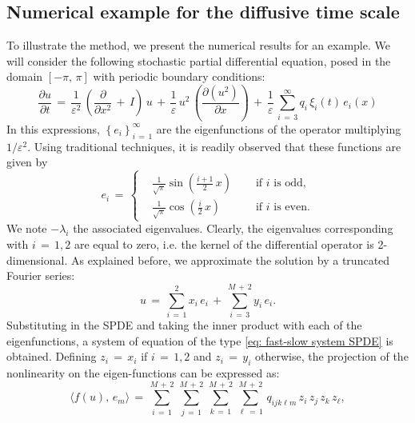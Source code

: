 \subsection{Numerical example for the diffusive time scale}
\label{sub:numerical_example}
To illustrate the method, we present the numerical results for an example. We will consider the following stochastic partial differential equation, posed in the domain $ [ -{\pi},\,{\pi}]$ with periodic boundary conditions:
\begin{equation}
    \frac{{\partial}u}{{\partial}t} \,=\,\frac{1}{{\varepsilon}^2}\, \left( \frac{\partial}{{\partial}x^2} \,+\,I\right)\,u \,+\, \frac{1}{\varepsilon} \, u^2\,\left(\frac{{\partial}(u^2)}{{\partial}x}\right) \,+\, \frac{1}{\varepsilon} \, \sum_{ i\,=\,3}^{ {\infty}}  q_i\,{\xi}_i(t)\, e_i(x) 
    \label{eq: undefined label}
\end{equation}
In this expressions, $\left\{e_i\right\}_{i\,=\,1}^{\infty}$ are the eigenfunctions of the operator multiplying $1/{\varepsilon}^2$. Using traditional techniques, it is readily observed that these functions are given by
\begin{equation*}
    e_i \,=\, \left\{
        \begin{aligned}
            & \frac{1}{\sqrt{\pi}}\sin\left(\frac{i+1}{2}\,x\right) &\quad \text{ if $i$ is odd,} \\
            & \frac{1}{\sqrt {\pi}}\cos\left(\frac{i}{2}\,x\right) &\quad \text{ if $i$ is even.}
        \end{aligned} \right .
\end{equation*}
We note $-{\lambda}_i$ the associated eigenvalues. Clearly, the eigenvalues corresponding with $i \,=\,1,2$ are equal to zero, i.e. the kernel of the differential operator is 2-dimensional. As explained before, we approximate the solution by a truncated Fourier series:
\begin{equation*}
    u \,=\, \sum_{ i\,=\,1}^{ 2} x_i\,e_i \,+\, \sum_{ i\,=\,3}^{ M\,+\,2} y_i \, e_i.
\end{equation*}
Substituting in the SPDE and taking the inner product with each of the eigenfunctions, a system of equation of the type \eqref{eq: fast-slow system SPDE} is obtained. Defining $z_i \,=\, x_i$ if $i \,=\,1,2$ and $z_i \,=\,y_i$ otherwise, the projection of the nonlinearity on the eigen-functions can be expressed as:
\begin{equation}
    \langle f(u),\,e_m\rangle \,=\,\sum_{ i\,=\,1}^{ M\,+\,2}\, \sum_{ j\,=\,1}^{ M\,+\,2}\,\sum_{ k\,=\,1}^{ M\,+\,2}\,\sum_{ {\ell}\,=\,1}^{ M\,+\,2}\, q_{ijk{\ell}m} \, z_i\,z_j\,z_k\,z_{\ell}, 
    \label{eq: projection nonlin example 1}
\end{equation}
